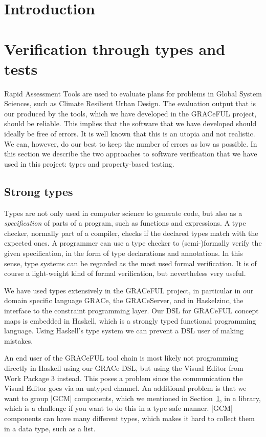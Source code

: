\documentclass{article}
\begin{document}
\section{Introduction}
\label{sec:intro}




\section{Verification through types and tests}
\label{sec:verification}

Rapid Assessment Tools are used to evaluate plans for problems in Global System
Sciences, such as Climate Resilient Urban Design. The evaluation output that is
our produced by the tools, which we have developed in the GRACeFUL project,
should be reliable. This implies that the software that we have developed should
ideally be free of errors. It is well known that this is an utopia and not
realistic. We can, however, do our best to keep the number of errors as low as
possible. In this section we describe the two approaches to software
verification that we have used in this project: types and property-based
testing. 

\subsection{Strong types}

Types are not only used in computer science to generate code, but also as a
\emph{specification} of parts of a program, such as functions and expressions. A
type checker, normally part of a compiler, checks if the declared types match
with the expected ones. A programmer can use a type checker to (semi-)formally
verify the given specification, in the form of type declarations and
annotations. In this sense, type systems can be regarded as the most used
formal verification. It is of course a light-weight kind of formal verification,
but nevertheless very useful. 

We have used types extensively in the GRACeFUL project, in particular in our
domain specific language GRACe, the GRACeServer, and in Haskelzinc, the
interface to the constraint programming layer. Our DSL for GRACeFUL concept maps
is embedded in Haskell, which is a strongly typed functional programming
language. Using Haskell's type system we can prevent a DSL user of making
mistakes.

An end user of the GRACeFUL tool chain is most likely not programming directly
in Haskell using our GRACe DSL, but using the Visual Editor from Work Package 3
instead. This poses a problem since the communication the Visual Editor goes via
an untyped channel. An additional problem is that we want to group |GCM|
components, which we mentioned in Section~\ref{sec:intro}, in a library, which
is a challenge if you want to do this in a type safe manner. |GCM| components can
have many different types, which makes it hard to collect them in a data type,
such as a list.
\end{document}
